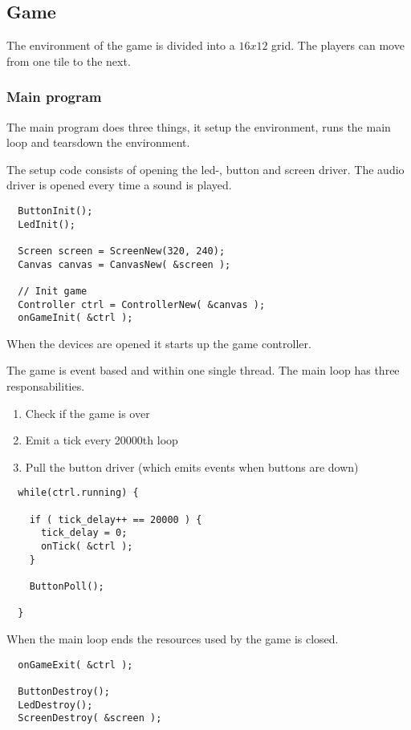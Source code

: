 \subsection{Game}

The environment of the game is divided into a $16x12$ grid. The players can move from one tile
to the next.

\subsubsection{Main program}

The main program does three things, it setup the environment, runs the main loop and tearsdown the environment.

The setup code consists of opening the led-, button and screen driver. The audio driver is opened every
time a sound is played.
\begin{lstlisting}
  ButtonInit();
  LedInit();

  Screen screen = ScreenNew(320, 240);
  Canvas canvas = CanvasNew( &screen );

  // Init game
  Controller ctrl = ControllerNew( &canvas );
  onGameInit( &ctrl );
\end{lstlisting}
When the devices are opened it starts up the game controller.

The game is event based and within one single thread. The main loop has three responsabilities.
\begin{enumerate}
\item Check if the game is over
\item Emit a tick every 20000th loop
\item Pull the button driver (which emits events when buttons are down)
\end{enumerate}
\begin{lstlisting}
  while(ctrl.running) {

    if ( tick_delay++ == 20000 ) {
      tick_delay = 0;
      onTick( &ctrl );
    }

    ButtonPoll();

  }
\end{lstlisting}

When the main loop ends the resources used by the game is closed.
\begin{lstlisting}
  onGameExit( &ctrl );

  ButtonDestroy();
  LedDestroy();
  ScreenDestroy( &screen );
\end{lstlisting}

